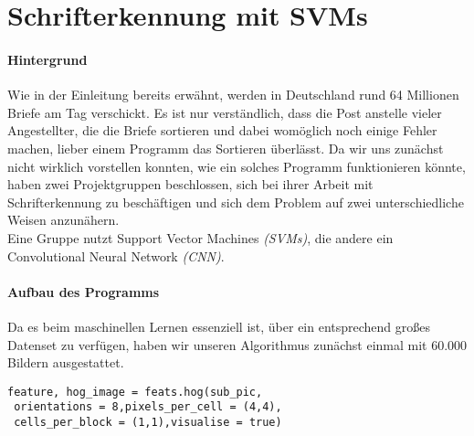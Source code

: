 \section{Schrifterkennung mit SVMs}

\paragraph{Hintergrund}
Wie in der Einleitung bereits erwähnt, werden in Deutschland rund 64 Millionen Briefe am Tag verschickt. Es ist nur verständlich, dass die Post anstelle vieler Angestellter, die die Briefe sortieren und dabei womöglich noch einige Fehler machen, lieber einem Programm das Sortieren überlässt. Da wir uns zunächst nicht wirklich vorstellen konnten, wie ein solches Programm funktionieren könnte, haben zwei Projektgruppen beschlossen, sich bei ihrer Arbeit mit Schrifterkennung zu beschäftigen und sich dem Problem auf zwei unterschiedliche Weisen anzunähern.\\
Eine Gruppe nutzt Support Vector Machines \textit{(SVMs)}, die andere ein Convolutional Neural Network \textit{(CNN)}.


\paragraph{Aufbau des Programms}
Da es beim maschinellen Lernen essenziell ist, über ein entsprechend großes Datenset zu verfügen, haben wir unseren Algorithmus zunächst einmal mit 60.000 Bildern ausgestattet. 

\begin{verbatim}
feature, hog_image = feats.hog(sub_pic,
 orientations = 8,pixels_per_cell = (4,4),
 cells_per_block = (1,1),visualise = true)
\end{verbatim}

